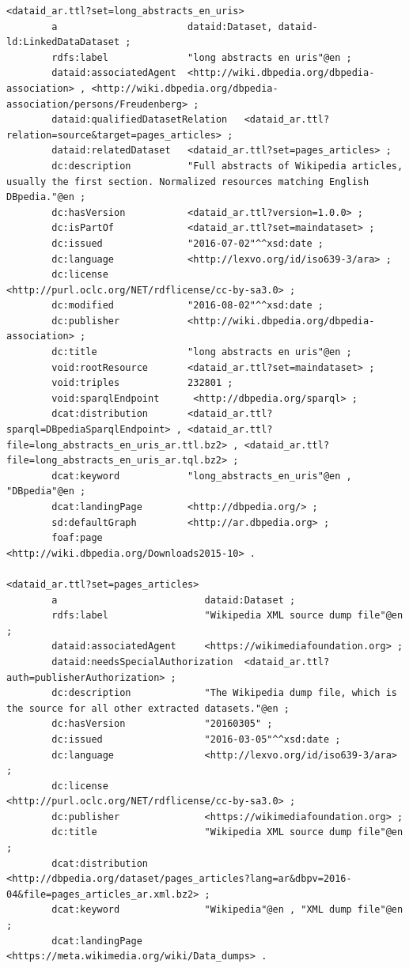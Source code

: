 \documentclass[a4paper,english,twoside,BCOR1.5cm,headsepline,DIV12,appendixprefix,final,12pt]{scrbook}
\begin{document}
\begin{lstlisting}[language=ttl, captionpos=b, label=lst:dcex,linewidth=\columnwidth,breaklines=true,basicstyle=\ttfamily\scriptsize]
<dataid_ar.ttl?set=long_abstracts_en_uris>
        a                       dataid:Dataset, dataid-ld:LinkedDataDataset ;
        rdfs:label              "long abstracts en uris"@en ;
        dataid:associatedAgent  <http://wiki.dbpedia.org/dbpedia-association> , <http://wiki.dbpedia.org/dbpedia-association/persons/Freudenberg> ;
        dataid:qualifiedDatasetRelation   <dataid_ar.ttl?relation=source&target=pages_articles> ;
        dataid:relatedDataset   <dataid_ar.ttl?set=pages_articles> ;
        dc:description          "Full abstracts of Wikipedia articles, usually the first section. Normalized resources matching English DBpedia."@en ;
        dc:hasVersion           <dataid_ar.ttl?version=1.0.0> ;
        dc:isPartOf             <dataid_ar.ttl?set=maindataset> ;
        dc:issued               "2016-07-02"^^xsd:date ;
        dc:language             <http://lexvo.org/id/iso639-3/ara> ;
        dc:license              <http://purl.oclc.org/NET/rdflicense/cc-by-sa3.0> ;
        dc:modified             "2016-08-02"^^xsd:date ;
        dc:publisher            <http://wiki.dbpedia.org/dbpedia-association> ;
        dc:title                "long abstracts en uris"@en ;
        void:rootResource       <dataid_ar.ttl?set=maindataset> ;
        void:triples            232801 ;
        void:sparqlEndpoint      <http://dbpedia.org/sparql> ;
        dcat:distribution       <dataid_ar.ttl?sparql=DBpediaSparqlEndpoint> , <dataid_ar.ttl?file=long_abstracts_en_uris_ar.ttl.bz2> , <dataid_ar.ttl?file=long_abstracts_en_uris_ar.tql.bz2> ;
        dcat:keyword            "long_abstracts_en_uris"@en , "DBpedia"@en ;
        dcat:landingPage        <http://dbpedia.org/> ;
        sd:defaultGraph         <http://ar.dbpedia.org> ;
        foaf:page               <http://wiki.dbpedia.org/Downloads2015-10> .
        
<dataid_ar.ttl?set=pages_articles>
        a                          dataid:Dataset ;
        rdfs:label                 "Wikipedia XML source dump file"@en ;
        dataid:associatedAgent     <https://wikimediafoundation.org> ;
        dataid:needsSpecialAuthorization  <dataid_ar.ttl?auth=publisherAuthorization> ;
        dc:description             "The Wikipedia dump file, which is the source for all other extracted datasets."@en ;
        dc:hasVersion              "20160305" ;
        dc:issued                  "2016-03-05"^^xsd:date ;
        dc:language                <http://lexvo.org/id/iso639-3/ara> ;
        dc:license                 <http://purl.oclc.org/NET/rdflicense/cc-by-sa3.0> ;
        dc:publisher               <https://wikimediafoundation.org> ;
        dc:title                   "Wikipedia XML source dump file"@en ;
        dcat:distribution          <http://dbpedia.org/dataset/pages_articles?lang=ar&dbpv=2016-04&file=pages_articles_ar.xml.bz2> ;
        dcat:keyword               "Wikipedia"@en , "XML dump file"@en ;
        dcat:landingPage           <https://meta.wikimedia.org/wiki/Data_dumps> .
        

\end{lstlisting}
\end{document}
